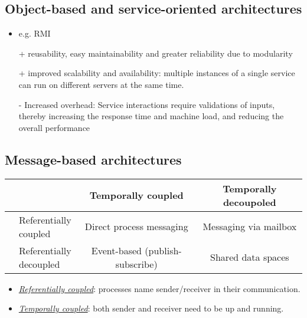 \documentclass[twocolumn,landscape,10pt]{article}
\theoremstyle{definition}
\begin{document}
\subsection{Object-based and service-oriented architectures}
\begin{itemize}
    \item e.g. RMI
    \item[+] reusability, easy maintainability and greater reliability
        due to modularity
    \item[+] improved scalability and availability: multiple instances
        of a single service can run on different servers at the same
        time.
    \item[-] Increased overhead: Service interactions require
        validations of inputs, thereby increasing the response time and
        machine load, and reducing the overall performance
\end{itemize} 

\subsection{Message-based architectures}
\begin{table}[h]
    \centering
    \begin{tabular}{ll||c|c}
          & & Temporally coupled & Temporally decoupoled \\
        \hline\hline
        \rule{0pt}{20px} &
        \shortstack{Referentially \\coupled} & Direct process messaging & Messaging via
        mailbox \\
        \hline
        \rule{0pt}{20px} &
        \shortstack{Referentially \\decoupled} & Event-based (publish-subscribe) &
        Shared data spaces \\
    \end{tabular} 
\end{table} 
\begin{itemize}
    \item \underline{\emph{Referentially coupled}}: processes name
        sender/receiver in their communication.
    \item \underline{\emph{Temporally coupled}}: both sender and receiver need
        to be up and running.
\end{itemize} 
\end{document}
